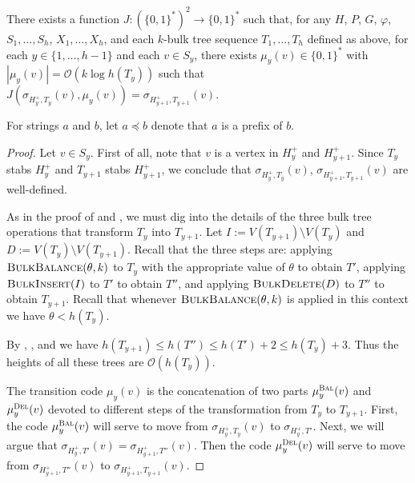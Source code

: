 \documentclass[kpfonts]{patmorin}
\newcommand{\Oh}{\mathcal{O}}
\let\leq\leqslant
\let\preceq\preccurlyeq
\begin{document}
\begin{lem}
  There exists a function $J:(\{0,1\}^*)^2\to \{0,1\}^*$ such that, 
  for any $H$, $P$, $G$, $\varphi$, $S_1,\dots,S_h$, $X_1,\dots,X_h$, and each $k$-bulk tree sequence $T_1,\dots,T_h$ defined as above, for each $y\in\{1,\dots,h-1\}$ and each $v\in S_y$, there exists $\mu_y(v)\in\{0,1\}^*$ with $|\mu_y(v)|= \Oh(k\log h(T_y))$ such that $J(\sigma_{H^+_y,T_y}(v), \mu_y(v))=\sigma_{H^+_{y+1},T_{y+1}}(v)$.
\end{lem}

For strings $a$ and $b$, let $a\preceq b$ denote that $a$ is a prefix of $b$.

\begin{proof}
  Let $v \in S_y$. 
  First of all, note that $v$ is a vertex in $H^+_y$ and $H^+_{y+1}$.
  Since $T_y$ stabs $H^+_y$ and $T_{y+1}$ stabs $H^+_{y+1}$,
  we conclude that $\sigma_{H^+_{y},T_y}(v)$, $\sigma_{H^+_{y+1},T_{y+1}}(v)$ are well-defined. 

  As in the proof of  and , we must dig into the details of the three bulk tree operations that transform $T_y$ into $T_{y+1}$. 
  Let $I:=V(T_{y+1})\setminus V(T_{y})$ and $D:=V(T_y)\setminus V(T_{y+1})$.
  Recall that the three steps are: 
  applying $\textsc{BulkBalance}(\theta,k)$ to $T_y$ with the appropriate value of $\theta$ to obtain $T'$,
  applying $\textsc{BulkInsert}(I)$ to $T'$ to obtain $T''$, and
  applying $\textsc{BulkDelete}(D)$ to $T''$ to obtain $T_{y+1}$.
  Recall that whenever $\textsc{BulkBalance}(\theta,k)$ is applied in this context we have $\theta < h(T_y)$.


  By , , and  we have  $h(T_{y+1}) \leq h(T'') \leq h(T')+2 \leq h(T_y)+3$.
  Thus the heights of all these trees are $\Oh(h(T_y))$.

  The transition code $\mu_y(v)$ is the concatenation of two parts $\mu_y^{\textsc{Bal}}(v)$ and $\mu_y^{\textsc{Del}}(v)$ devoted to different steps of the transformation from $T_y$ to $T_{y+1}$. 
  First, the code $\mu_y^{\textsc{Bal}}(v)$ will serve to move from $\sigma_{H^+_y,T_y}(v)$ to $\sigma_{H^+_y,T'}$. 
  Next, we will argue that $\sigma_{H^+_y,T'}(v) = \sigma_{H^+_{y+1},T''}(v)$.
  Then the code $\mu_y^{\textsc{Del}}(v)$ will serve to move from $\sigma_{H^+_{y+1},T''}(v)$ to $\sigma_{H^+_{y+1},T_{y+1}}(v)$.


\end{proof}
\end{document}
